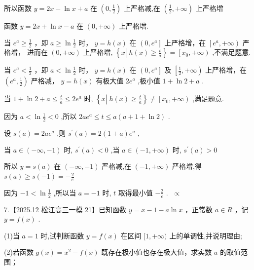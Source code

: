 \documentclass[10pt]{article}
\newcommand*\circled[1]{\tikz[baseline=(char.base)]{\node[shape=circle,draw,inner sep=1.5pt] (char) {\small #1};}}
\begin{document}
所以函数 \(y = {2x} - \ln x + a\) 在 \(\left( {0,\frac{1}{2}}\right)\) 上严格减,在 \(\left( {\frac{1}{2}, + \infty }\right)\) 上严格增

函数 \(y = {2x} + \ln x - a\) 在 \(\left( {0, + \infty }\right)\) 上严格增.

 \circled{1}  当 \({e}^{a} \geq  \frac{1}{2}\) ，即 \(a \geq  \ln \frac{1}{2}\) 时， \(y = h\left( x\right)\) 在 \(\left( {0,{e}^{a}}\right\rbrack\) 上严格增，在 \(\left\lbrack  {{e}^{a}, + \infty }\right)\) 严格增， 进而在 \(\left( {0, + \infty }\right)\) 上严格增, \(\left\{  {x\left| {\;h\left( x\right)  \geq  \frac{t}{a}}\right. }\right\}   = \left\lbrack  {{x}_{0}, + \infty }\right)\) ,不满足题意.

 \circled{2}  当 \({e}^{a} < \frac{1}{2}\) ，即 \(a < \ln \frac{1}{2}\) 时， \(y = h\left( x\right)\) 在 \(\left( {0,{e}^{a}}\right\rbrack\) 及 \(\left\lbrack  {\frac{1}{2}, + \infty }\right)\) 上严格增，在 \(\left( {{e}^{a},\frac{1}{2}}\right)\) 严格减， \(y = h\left( x\right)\) 有极大值 \(2{e}^{a}\) ,极小值 \(1 + \ln 2 + a\) .

当 \(1 + \ln 2 + a \leq  \frac{t}{a} \leq  2{e}^{a}\) 时, \(\left\{  {x\left| {\;h\left( x\right)  \geq  \frac{t}{a}}\right. }\right\}   \neq  \left\lbrack  {{x}_{0}, + \infty }\right)\) ,满足题意.

因为 \(a < \ln \frac{1}{2} < 0\) ,所以 \({2a}{e}^{a} \leq  t \leq  a\left( {a + 1 + \ln 2}\right)\) .

设 \(s\left( a\right)  = {2a}{e}^{a}\) ,则 \({s}^{\prime }\left( a\right)  = 2\left( {1 + a}\right) {e}^{a}\) ,

当 \(a \in  \left( {-\infty , - 1}\right)\) 时, \({s}^{\prime }\left( a\right)  < 0\) ,当 \(a \in  \left( {-1, + \infty }\right)\) 时, \({s}^{\prime }\left( a\right)  > 0\)

所以 \(y = s\left( a\right)\) 在 \(\left( {-\infty , - 1}\right)\) 严格减,在 \(\left( {-1, + \infty }\right)\) 严格增,得 \(s\left( a\right)  \geq  s\left( {-1}\right)  =  - \frac{2}{e}\)

因为 \(- 1 < \ln \frac{1}{2}\) ,所以当 \(a =  - 1\) 时, \(t\) 取得最小值 \(- \frac{2}{e}\) . \(\; \propto\)

7.【2025.12 松江高三一模 21】已知函数 \(y = x - 1 - a\ln x\) ，正常数 \(a \in  R\) ，记 \(y = f\left( x\right)\) .

(1)当 \(a = 1\) 时,试判断函数 \(y = f\left( x\right)\) 在区间 \(\lbrack 1, + \infty )\) 上的单调性,并说明理由;

(2)若函数 \(g\left( x\right)  = {x}^{2} - f\left( x\right)\) 既存在极小值也存在极大值，求实数 \(a\) 的取值范围；
\end{document}
